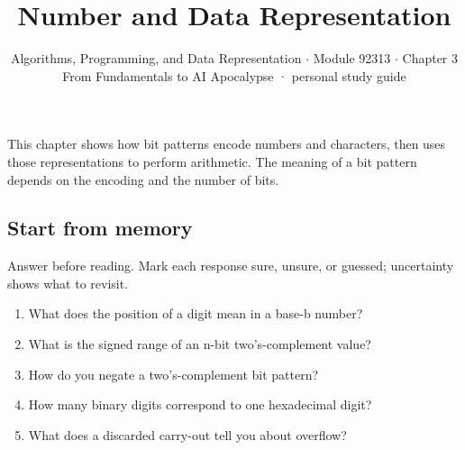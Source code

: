 \documentclass[11pt]{article}
\title{\sffamily\bfseries\color{FAUblue}Number and Data Representation}
\author{Algorithms, Programming, and Data Representation \ensuremath{\cdot} Module 92313 \ensuremath{\cdot} Chapter 3\\[2pt]\small From Fundamentals to AI Apocalypse · personal study guide}
\date{}
\begin{document}
\maketitle
\begingroup\footnotesize\setlength{\parskip}{0pt}\tableofcontents\endgroup
\clearpage

{\large This chapter shows how bit patterns encode numbers and characters, then uses those representations to perform arithmetic. The meaning of a bit pattern depends on the encoding and the number of bits.}


\begin{keepsection}
\section{Start from memory}

Answer before reading. Mark each response sure, unsure, or guessed; uncertainty shows what to revisit.

\begin{enumerate}
\item What does the position of a digit mean in a base-b number?
\item What is the signed range of an n-bit two’s-complement value?
\item How do you negate a two’s-complement bit pattern?
\item How many binary digits correspond to one hexadecimal digit?
\item What does a discarded carry-out tell you about overflow?
\end{enumerate}

\end{keepsection}
\end{document}
